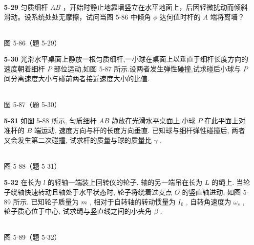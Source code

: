 \newpage

\textbf{5-29} 匀质细杆 $AB$ ，开始时静止地靠墙竖立在水平地面上，后因轻微扰动而倾斜滑动。设系统处处无摩擦，试问当图 5-86 中倾角 $\phi$ 达何值时杆的 $A$ 端将离墙？

\begin{center}
\resizebox{0.37\textwidth}{!}{}\\[4pt]
{\small 图 5-86（题 5-29）}
\end{center}

\newpage

\textbf{5-30} 光滑水平桌面上静放一根匀质细杆,一小球在桌面上以垂直于细杆长度方向的速度朝着细杆 $P$ 部位运动,如图 5-87 所示.设两者发生弹性碰撞,试求碰后小球与 $P$ 间分离速度大小与碰前两者接近速度大小的比值.

\begin{center}
\resizebox{0.40\textwidth}{!}{}\\[4pt]
{\small 图 5-87（题 5-30）}
\end{center}

\newpage

\textbf{5-31} 如图 5-88 所示, 匀质细杆 $AB$ 静放在光滑水平桌面上,小球 $P$ 在此平面上对准杆的 $B$ 端运动, 速度方向与杆的长度方向垂直. 已知球与细杆弹性碰撞后, 两者又会发生第二次碰撞, 试求杆的质量与球的质量比 $\gamma$ .

\begin{center}
\resizebox{0.39\textwidth}{!}{}\\[4pt]
{\small 图 5-88（题 5-31）}
\end{center}

\newpage

\textbf{5-32} 在长为 $l$ 的轻轴一端装上回转仪的轮子, 轴的另一端吊在长为 $L$ 的绳上. 当轮子绕轴快速转动且轴处于水平状态时, 轮子将绕着过支点 $O$ 的竖直轴进动, 如图 5-89 所示. 已知轮子质量为 $m$ , 相对于自转轴的转动惯量为 $I_0$ , 自转角速度为 $\omega_s$ , 轮子质心位于中心, 试求绳与竖直线之间的小夹角 $\beta$ .

\begin{center}
\resizebox{0.36\textwidth}{!}{}\\[4pt]
{\small 图 5-89（题 5-32）}
\end{center}

\newpage

